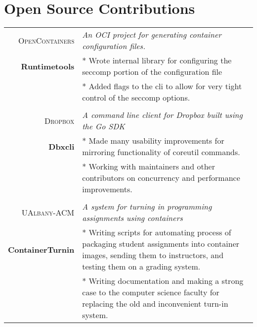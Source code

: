 \documentclass[a4paper,10pt]{article}
\begin{document}
\section{Open Source Contributions}
\begin{tabular}{rp{11cm}}

\textsc{OpenContainers}& 
\textit{An OCI project for generating container configuration files.} \\
\textbf{Runtimetools}

&\footnotesize{* Wrote internal library for configuring the seccomp portion of the configuration file}\\
&\footnotesize{* Added flags to the cli to allow for very tight control of the seccomp options.}\\\\


\textsc{Dropbox}& 
\textit{A command line client for Dropbox built using the Go SDK} \\
\textbf{Dbxcli}

&\footnotesize{* Made many usability improvements for mirroring functionality of coreutil commands.}\\
&\footnotesize{* Working with maintainers and other contributors on concurrency and performance improvements.}\\\\

\textsc{UAlbany-ACM}& 
\textit{A system for turning in programming assignments using containers} \\
\textbf{ContainerTurnin}

&\footnotesize{* Writing scripts for automating process of packaging student assignments into container images, sending them to instructors, and testing them on a grading system.}\\
&\footnotesize{* Writing documentation and making a strong case to the computer science faculty for replacing the old and inconvenient turn-in system.}

\end{tabular}
\end{document}
